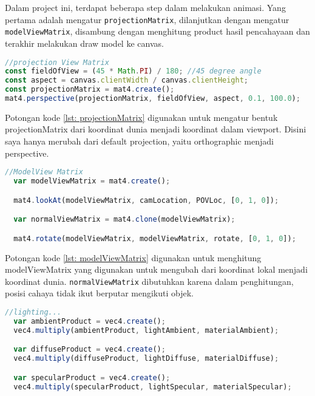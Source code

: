 Dalam project ini, terdapat beberapa step dalam melakukan animasi. Yang pertama adalah mengatur \texttt{projectionMatrix}, dilanjutkan dengan mengatur \texttt{modelViewMatrix}, disambung dengan menghitung product hasil pencahayaan dan terakhir melakukan draw model ke canvas.

\begin{lstlisting}[language=javascript, label={lst: projectionMatrix}, caption={mengatur projectionMatrix}]
//projection View Matrix
const fieldOfView = (45 * Math.PI) / 180; //45 degree angle
const aspect = canvas.clientWidth / canvas.clientHeight;
const projectionMatrix = mat4.create();
mat4.perspective(projectionMatrix, fieldOfView, aspect, 0.1, 100.0);

\end{lstlisting}

Potongan kode \ref{lst: projectionMatrix} digunakan untuk mengatur bentuk projectionMatrix dari koordinat dunia menjadi koordinat dalam viewport. Disini saya hanya merubah dari default projection, yaitu orthographic menjadi perspective.

\begin{lstlisting}[language=javascript, label={lst: modelViewMatrix}, caption={mengatur modelViewMatrix}]
//ModelView Matrix
  var modelViewMatrix = mat4.create();

  mat4.lookAt(modelViewMatrix, camLocation, POVLoc, [0, 1, 0]);

  var normalViewMatrix = mat4.clone(modelViewMatrix);

  mat4.rotate(modelViewMatrix, modelViewMatrix, rotate, [0, 1, 0]);

\end{lstlisting}

Potongan kode \ref{lst: modelViewMatrix} digunakan untuk menghitung modelViewMatrix yang digunakan untuk mengubah dari koordinat lokal menjadi koordinat dunia. \texttt{normalViewMatrix} dibutuhkan karena dalam penghitungan, posisi cahaya tidak ikut berputar mengikuti objek.

\begin{lstlisting}[language=javascript, label={lst: lightingProduct}, caption={mengatur pencahayaan}]
//lighting...
  var ambientProduct = vec4.create();
  vec4.multiply(ambientProduct, lightAmbient, materialAmbient);

  var diffuseProduct = vec4.create();
  vec4.multiply(diffuseProduct, lightDiffuse, materialDiffuse);

  var specularProduct = vec4.create();
  vec4.multiply(specularProduct, lightSpecular, materialSpecular);

\end{lstlisting}

